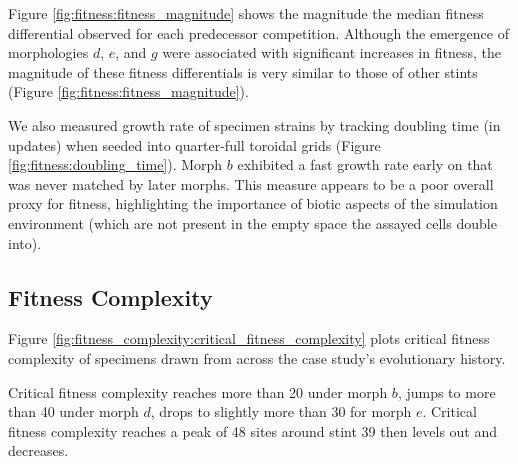 Figure \ref{fig:fitness:fitness_magnitude} shows the magnitude the median fitness differential observed for each predecessor competition.
Although the emergence of morphologies $d$, $e$, and $g$ were associated with significant increases in fitness, the magnitude of these fitness differentials is very similar to those of other stints (Figure \ref{fig:fitness:fitness_magnitude}).

We also measured growth rate of specimen strains by tracking doubling time (in updates) when seeded into quarter-full toroidal grids (Figure \ref{fig:fitness:doubling_time}).
Morph $b$ exhibited a fast growth rate early on that was never matched by later morphs.
This measure appears to be a poor overall proxy for fitness, highlighting the importance of biotic aspects of the simulation environment (which are not present in the empty space the assayed cells double into).











\subsection{Fitness Complexity}



Figure \ref{fig:fitness_complexity:critical_fitness_complexity} plots critical fitness complexity of specimens drawn from across the case study's evolutionary history.

Critical fitness complexity reaches more than 20 under morph $b$, jumps to more than 40 under morph $d$, drops to slightly more than 30 for morph $e$.
Critical fitness complexity reaches a peak of 48 sites around stint 39 then levels out and decreases.


